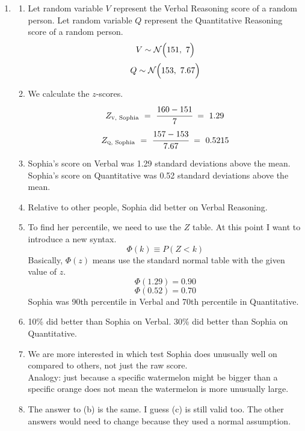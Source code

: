\documentclass[12pt,letterpaper]{article}
\begin{document}
\begin{enumerate}
\item \begin{enumerate}
\item Let random variable $V$ represent the Verbal Reasoning score of a random person. Let random variable $Q$ represent the  Quantitative Reasoning score of a random person.
$$V \sim \mathcal{N}\Big(151,~ 7\Big)$$ 
$$Q \sim \mathcal{N}\Big(153,~ 7.67\Big)$$ 
\newcommand{\zv}{Z_{\textsc{v}, \text{ Sophia}}}
\newcommand{\zq}{Z_{\textsc{q}, \text{ Sophia}}}
\item We calculate the $z$-scores.
$$\zv ~=~ \cfrac{160-151}{7} ~=~ 1.29$$
$$\zq ~=~ \cfrac{157-153}{7.67} ~=~ 0.5215$$
\item Sophia's score on Verbal was 1.29 standard deviations above the mean. Sophia's score on Quantitative was 0.52 standard deviations above the mean.
\item Relative to other people, Sophia did better on Verbal Reasoning.
\item To find her percentile, we need to use the $Z$ table. At this point I want to introduce a new syntax.
$$\Phi(k) \equiv P(Z<k) $$
Basically, $\Phi(z)$ means use the standard normal table with the given value of $z$.
$$\Phi(1.29) = 0.90 $$
$$\Phi(0.52) = 0.70 $$
Sophia was 90th percentile in Verbal and 70th percentile in Quantitative.
\item 10\% did better than Sophia on Verbal. 30\% did better than Sophia on Quantitative.
\item We are more interested in which test Sophia does unusually well on compared to others, not just the raw score.\\
Analogy: just because a specific watermelon might be bigger than a specific orange does not mean the watermelon is more unusually large. 
\item The answer to (b) is the same. I guess (c) is still valid too. The other answers would need to change because they used a normal assumption.
\end{enumerate}

\newpage


\end{enumerate}
\end{document}
